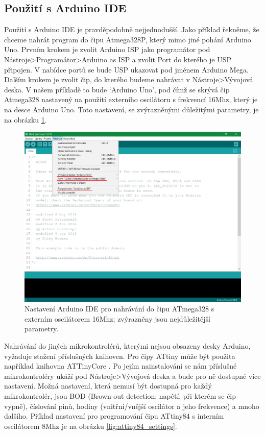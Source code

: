 \documentclass[11pt,a4paper,twoside,openright]{report}
\begin{document}
\subsection {Použití s Arduino IDE}

Použití s Arduino IDE je pravděpodobně nejjednodušší. Jako příklad řekněme, že chceme nahrát program do čipu Atmega328P, který mimo jiné pohání Arduino Uno. Prvním krokem je zvolit Arduino ISP jako programátor pod Nástroje>Programátor>Arduino as ISP a zvolit Port do kterého je USP připojen. V nabídce portů se bude USP ukazovat pod jménem Arduino Mega. Dalším krokem je zvolit čip, do kterého budeme nahrávat v Nástroje>Vývojová deska. V našem příkladě to bude \lq Arduino Uno\rq , pod čímž se skrývá čip Atmega328 nastavený na použití externího oscilátoru s frekvencí 16Mhz, který je na desce Arduino Uno. Toto nastavení, se zvýrazněnými důležitými parametry, je na obrázku \ref{fig:uno_settings}.

\begin{figure}[ht!]
  \includegraphics[width=\linewidth]{img/uno_settings.png}
  \centering
  \caption{Nastavení Arduino IDE pro nahrávání do čipu ATmega328 s externím oscilátorem 16Mhz; zvýrazněny jsou nejdůležitější parametry.}
  \label{fig:uno_settings}
\end{figure}

Nahrávání do jiných mikrokontrolérů, kterými nejsou obsazeny desky Arduino, vyžaduje stažení příslušných knihoven. Pro čipy ATtiny může být použita například knihovna ATTinyCore \cite{attinycore}. Po jejím nainstalování se nám příslušné mikrokontroléry ukáží pod Nástroje>Vývojová deska a bude pro ně dostupné více nastavení. Možná nastavení, která nemusí být dostupná pro každý mikrokontrolér, jsou BOD (Brown-out detection; napětí, při kterém se čip vypně), číslování pinů, hodiny (vnitřní/vnější oscilátor a jeho frekvence) a mnoho dalšího. Příklad nastavení pro programování čipu ATtiny84 s interním oscilátorem 8Mhz je na obrázku \ref{fig:attiny84_settings}.
\end{document}
